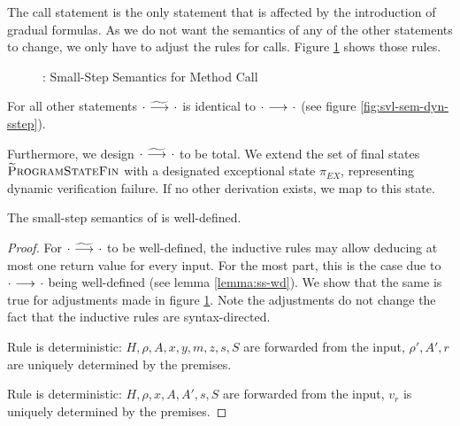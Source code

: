 The call statement is the only statement that is affected by the introduction of gradual formulas.
As we do not want the semantics of any of the other statements to change, we only have to adjust the rules for calls.
Figure \ref{fig:gvl-sem-dyn-sstep} shows those rules.
\begin{figure}
    \boxed{\gsstep{\pi}{\pi}}
    
    \caption{\gvlidf: Small-Step Semantics for Method Call}
    \label{fig:gvl-sem-dyn-sstep}
\end{figure}
For all other statements ${\cdot} \,\,{\widetilde{\longrightarrow}^{}}\,\, {\cdot}$ is identical to ${\cdot} \,\,{\longrightarrow^{}}\,\, {\cdot}$ (see figure \ref{fig:svl-sem-dyn-sstep}).

Furthermore, we design ${\cdot} \,\,{\widetilde{\longrightarrow}^{}}\,\, {\cdot}$ to be total.
We extend the set of final states $\textup{\textsc{\ensuremath{\widetilde{\text{P}}}rogramStateFin}}$ with a designated exceptional state $\pi_{EX}$, representing dynamic verification failure.
If no other derivation exists, we map to this state.

\begin{lemma}
    The small-step semantics of \gvlidf is well-defined.
\end{lemma}
\begin{proof}
    For ${\cdot} \,\,{\widetilde{\longrightarrow}^{}}\,\, {\cdot}$ to be well-defined, the inductive rules may allow deducing at most one return value for every input.
    For the most part, this is the case due to ${\cdot} \,\,{\longrightarrow^{}}\,\, {\cdot}$ being well-defined (see lemma \ref{lemma:ss-wd}).
    We show that the same is true for adjustments made in figure \ref{fig:gvl-sem-dyn-sstep}.
    Note the adjustments do not change the fact that the inductive rules are syntax-directed.
    
    Rule  is deterministic:
    $H, \rho, A, x, y, m, z, s, S$ are forwarded from the input, $\rho', A', r$ are uniquely determined by the premises.
    
    Rule  is deterministic:
    $H, \rho, x, A, A', s, S$ are forwarded from the input, $v_r$ is uniquely determined by the premises.
\end{proof}

